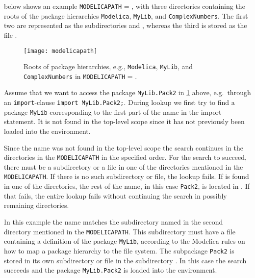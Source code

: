 \begin{example}
 below shows an example \lstinline!MODELICAPATH! = , with three
directories containing the roots of the package hierarchies \lstinline!Modelica!, \lstinline!MyLib!, and \lstinline!ComplexNumbers!.  The first two are represented as
the subdirectories  and , whereas the third is stored
as the file .

\begin{figure}[H]
  \begin{center}
    \texttt{[image: modelicapath]}
  \end{center}
  \caption{Roots of package hierarchies, e.g., \lstinline!Modelica!, \lstinline!MyLib!, and \lstinline!ComplexNumbers! in
  \lstinline!MODELICAPATH! = .}
  \label{fig:roots}
\end{figure}

Assume that we want to access the package \lstinline!MyLib.Pack2! in \cref{fig:roots} above, e.g.\ through an \lstinline!import!-clause \lstinline!import MyLib.Pack2;!.
During lookup we first try to find a package \lstinline!MyLib! corresponding to the first part of the name in the import-statement.
It is not found in the top-level scope since it has not previously been loaded into the environment.

Since the name was not found in the top-level scope the search continues in the directories in the \lstinline!MODELICAPATH! in the specified order.  For the search to succeed,
there must be a subdirectory  or a file  in one of the directories mentioned in the \lstinline!MODELICAPATH!.  If there is no such
subdirectory or file, the lookup fails.  If  is found in one of the directories, the rest of the name, in this case \lstinline!Pack2!, is located in
.  If that fails, the entire lookup fails without continuing the search in possibly remaining directories.

In this example the name matches the subdirectory named  in the second directory  mentioned in the \lstinline!MODELICAPATH!.
This subdirectory must have a file  containing a definition of the package \lstinline!MyLib!, according to the Modelica rules on how to map a package
hierarchy to the file system.  The subpackage \lstinline!Pack2! is stored in its own subdirectory or file in the subdirectory .  In this case the search
succeeds and the package \lstinline!MyLib.Pack2! is loaded into the environment.
\end{example}


